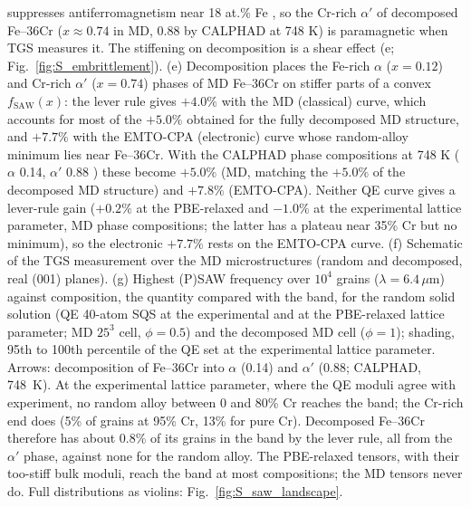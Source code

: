 \documentclass[final,3p,times]{elsarticle}
\begin{document}
suppresses antiferromagnetism near 18 at.\% Fe \cite{xiong2011improved}, so the Cr-rich $\alpha'$ of decomposed Fe--36Cr ($x\approx0.74$ in MD, 0.88 by CALPHAD at 748 K) is paramagnetic when TGS measures it. The stiffening on decomposition is a shear effect (e; Fig.~\ref{fig:S_embrittlement}). (e) Decomposition places the Fe-rich $\alpha$ ($x=0.12$) and Cr-rich $\alpha'$ ($x=0.74$) phases of MD Fe--36Cr on stiffer parts of a convex $f_{\mathrm{SAW}}(x)$: the lever rule gives $+4.0\%$ with the MD (classical) curve, which accounts for most of the $+5.0\%$ obtained for the fully decomposed MD structure, and $+7.7\%$ with the EMTO-CPA (electronic) curve whose random-alloy minimum lies near Fe--36Cr. With the CALPHAD phase compositions at 748 K ($\alpha$ 0.14, $\alpha'$ 0.88 \cite{xiong2011improved}) these become $+5.0\%$ (MD, matching the $+5.0\%$ of the decomposed MD structure) and $+7.8\%$ (EMTO-CPA). Neither QE curve gives a lever-rule gain ($+0.2\%$ at the PBE-relaxed and $-1.0\%$ at the experimental lattice parameter, MD phase compositions; the latter has a plateau near 35\% Cr but no minimum), so the electronic $+7.7\%$ rests on the EMTO-CPA curve. (f) Schematic of the TGS measurement over the MD microstructures (random and decomposed, real (001) planes). (g) Highest (P)SAW frequency over $10^4$ grains ($\lambda=6.4\,\mu$m) against composition, the quantity compared with the band, for the random solid solution (QE 40-atom SQS at the experimental and at the PBE-relaxed lattice parameter; MD $25^3$ cell, $\phi=0.5$) and the decomposed MD cell ($\phi=1$); shading, 95th to 100th percentile of the QE set at the experimental lattice parameter. Arrows: decomposition of Fe--36Cr into $\alpha$ (0.14) and $\alpha'$ (0.88; CALPHAD, 748~K). At the experimental lattice parameter, where the QE moduli agree with experiment, no random alloy between 0 and 80\% Cr reaches the band; the Cr-rich end does (5\% of grains at 95\% Cr, 13\% for pure Cr). Decomposed Fe--36Cr therefore has about 0.8\% of its grains in the band by the lever rule, all from the $\alpha'$ phase, against none for the random alloy. The PBE-relaxed tensors, with their too-stiff bulk moduli, reach the band at most compositions; the MD tensors never do. Full distributions as violins: Fig.~\ref{fig:S_saw_landscape}.
\clearpage
\end{document}
